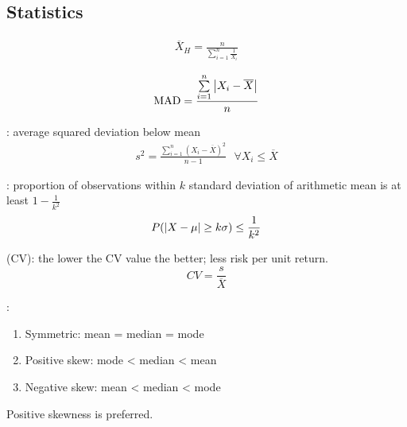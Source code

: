 \subsection{Statistics}

\begin{definition}
\begin{align}
\overline{X}_H = \frac{n}{\sum\limits_{i=1}^n \frac{1}{X_i}} \nonumber
\end{align}
\end{definition}

\begin{definition}
\begin{align}
\text{MAD} = \frac{\sum\limits_{i=1}^n \left\lvert X_i - \overline{X}\right\rvert}{n} \nonumber
\end{align}
\end{definition}

\begin{definition}
: average squared deviation below mean
\begin{align}
s^2 = \frac{\sum\limits_{i=1}^n (X_i - \overline{X})^2}{n-1} \ \ \ \forall X_i \leq \overline{X} \nonumber
\end{align}
\end{definition}

\begin{definition}
: proportion of observations within $k$ standard deviation of arithmetic mean is at least $1 - \frac{1}{k^2}$
\begin{align}
P(\left\lvert X - \mu\right\rvert \geq k \sigma) \leq \frac{1}{k^2} \nonumber
\end{align}
\end{definition}

\begin{definition}
 (CV): the lower the CV value the better; less risk per unit return.
\begin{equation}
CV = \frac{s}{\overline{X}} \nonumber
\end{equation}
\end{definition}

\begin{definition}
:
\begin{enumerate}[label=\roman*.]
\setlength{\itemsep}{0pt}
\item Symmetric: mean = median = mode
\item Positive skew: mode < median < mean
\item Negative skew: mean < median < mode
\end{enumerate}
Positive skewness is preferred.
\end{definition}

